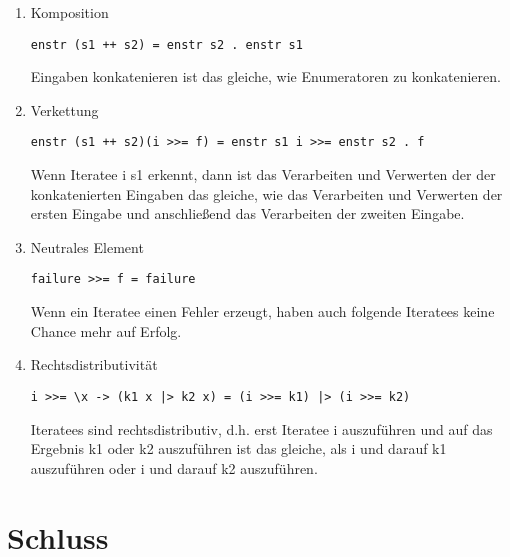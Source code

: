 \documentclass[draft=false
              ,paper=a4
              ,twoside=false
              ,fontsize=11pt
              ,headsepline
              ,BCOR10mm
              ,DIV11
              ]{scrbook}
\begin{document}
\begin{enumerate}
  \item Komposition
    \begin{lstlisting}
enstr (s1 ++ s2) = enstr s2 . enstr s1
    \end{lstlisting}

    Eingaben konkatenieren ist das gleiche, wie Enumeratoren zu konkatenieren.

  \item Verkettung
    \begin{lstlisting}
enstr (s1 ++ s2)(i >>= f) = enstr s1 i >>= enstr s2 . f
    \end{lstlisting}

    Wenn Iteratee i s1 erkennt, dann ist das Verarbeiten und Verwerten der der konkatenierten Eingaben das gleiche, wie das Verarbeiten und Verwerten der ersten Eingabe und anschließend das Verarbeiten der zweiten Eingabe.

  \item Neutrales Element
    \begin{lstlisting}
failure >>= f = failure
    \end{lstlisting}

    Wenn ein Iteratee einen Fehler erzeugt, haben auch folgende Iteratees keine Chance mehr auf Erfolg.

  \item Rechtsdistributivität
    \begin{lstlisting}
i >>= \x -> (k1 x |> k2 x) = (i >>= k1) |> (i >>= k2)
    \end{lstlisting}

    Iteratees sind rechtsdistributiv, d.h. erst Iteratee i auszuführen und auf das Ergebnis k1 oder k2 auszuführen ist das gleiche, als i und darauf k1 auszuführen oder i und darauf k2 auszuführen.
\end{enumerate}











\chapter{Schluss} %
\label{cha:schluss}
\end{document}
